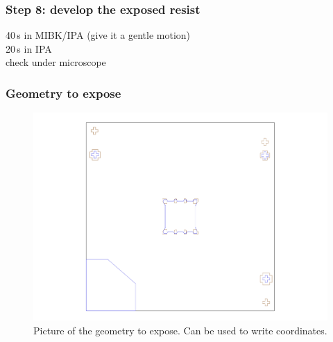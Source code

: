 \documentclass[12pt,a4paper]{report}
\begin{document}
\begin{enumerate}
\subsubsection{Step 8: develop the exposed resist}

40\,s in MIBK/IPA (give it a gentle motion)\\
20\,s in IPA\\

check under microscope\\

\newpage

\subsubsection{Geometry to expose}

\begin{figure} [h] \centering
\includegraphics[scale=0.6]{fig/align1_1.pdf}
\caption{Picture of the geometry to expose. Can be used to write coordinates.} \label{align1}
\end{figure}

\newpage


\end{enumerate}
\end{document}
